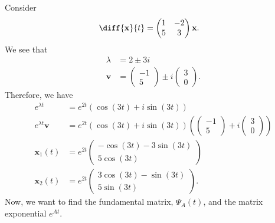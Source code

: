 \documentclass[10pt]{mypackage}
\begin{document}
\begin{example}
  Consider
  \begin{align*}
    \diff{\mathbf{x}}{t} &= \begin{pmatrix}1 & -2 \\ 5 & 3\end{pmatrix} \mathbf{x}.
  \end{align*}
  We see that
  \begin{align*}
    \lambda &= 2 \pm 3i\\
    \mathbf{v} &= \begin{pmatrix}-1\\5\end{pmatrix} \pm i \begin{pmatrix}3\\0\end{pmatrix}.
  \end{align*}
  Therefore, we have
  \begin{align*}
    e^{\lambda t} &= e^{2t}\left( \cos\left( 3t \right) + i\sin\left( 3t \right) \right)\\
    e^{\lambda t} \mathbf{v} &= e^{2t}\left( \cos\left( 3t \right) + i\sin\left( 3t \right) \right) \left( \begin{pmatrix}-1\\5\end{pmatrix} + i \begin{pmatrix}3\\0\end{pmatrix} \right)\\
    \mathbf{x}_1(t) &= e^{2t} \begin{pmatrix}-\cos(3t) - 3\sin(3t) \\ 5\cos(3t)\end{pmatrix}\\
    \mathbf{x}_2(t) &= e^{2t} \begin{pmatrix}3\cos(3t) - \sin(3t) \\ 5\sin(3t)\end{pmatrix}.
  \end{align*}
  Now, we want to find the fundamental matrix, $\Psi_A(t)$, and the matrix exponential $e^{At}$.\newline


\end{example}
\end{document}
